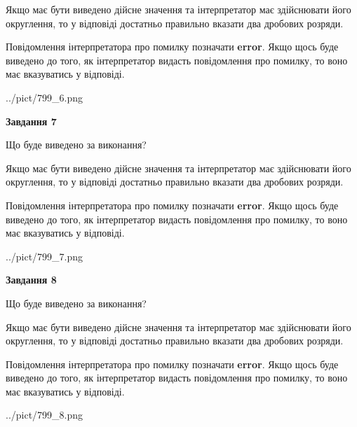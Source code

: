 \documentclass[12pt, ukrainian]{article}
\begin{document}
{\begin {Large}
Якщо має бути виведено дійсне значення та інтерпретатор має здійснювати його округлення, 
то у відповіді достатньо правильно вказати два дробових розряди.

Повідомлення інтерпретатора про помилку позначати \textbf{error}.
Якщо щось буде виведено до того, як інтерпретатор видасть повідомлення про помилку, 
то воно має вказуватись у відповіді. \par

\begin{center}
	{../pict/799_6.png}
\end{center}
\newpage

{\begin {center}\textbf{Завдання 7}\end {center}}\par
Що буде виведено за виконання? \par

Якщо має бути виведено дійсне значення та інтерпретатор має здійснювати його округлення, 
то у відповіді достатньо правильно вказати два дробових розряди.

Повідомлення інтерпретатора про помилку позначати \textbf{error}.
Якщо щось буде виведено до того, як інтерпретатор видасть повідомлення про помилку, 
то воно має вказуватись у відповіді. \par

\begin{center}
	{../pict/799_7.png}
\end{center}
\newpage

{\begin {center}\textbf{Завдання 8}\end {center}}\par
Що буде виведено за виконання? \par

Якщо має бути виведено дійсне значення та інтерпретатор має здійснювати його округлення, 
то у відповіді достатньо правильно вказати два дробових розряди.

Повідомлення інтерпретатора про помилку позначати \textbf{error}.
Якщо щось буде виведено до того, як інтерпретатор видасть повідомлення про помилку, 
то воно має вказуватись у відповіді. \par

\begin{center}
	{../pict/799_8.png}
\end{center}
\newpage


\end{Large}}
\end{document}
